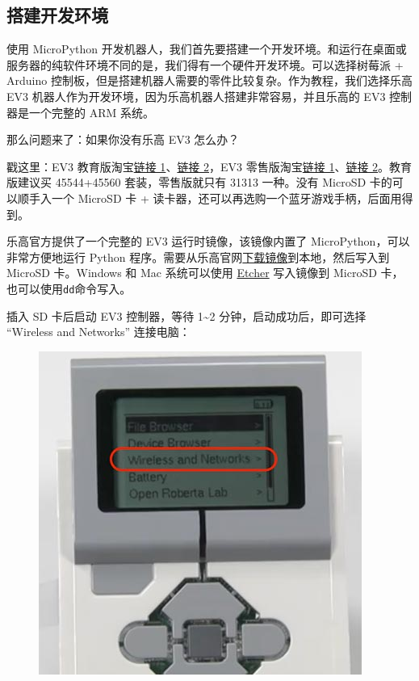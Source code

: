 \hypertarget{ux642dux5efaux5f00ux53d1ux73afux5883}{%
\subsection{搭建开发环境}\label{ux642dux5efaux5f00ux53d1ux73afux5883}}

使用 MicroPython
开发机器人，我们首先要搭建一个开发环境。和运行在桌面或服务器的纯软件环境不同的是，我们得有一个硬件开发环境。可以选择树莓派
+ Arduino
控制板，但是搭建机器人需要的零件比较复杂。作为教程，我们选择乐高 EV3
机器人作为开发环境，因为乐高机器人搭建非常容易，并且乐高的 EV3
控制器是一个完整的 ARM 系统。

那么问题来了：如果你没有乐高 EV3 怎么办？

戳这里：EV3 教育版淘宝\href{https://s.click.taobao.com/PeMmziv}{链接
1}、\href{https://s.click.taobao.com/VsKmziv}{链接 2}，EV3
零售版淘宝\href{https://s.click.taobao.com/UMLmziv}{链接
1}、\href{https://s.click.taobao.com/PuMmziv}{链接 2}。教育版建议买
45544+45560 套装，零售版就只有 31313 一种。没有 MicroSD
卡的可以顺手入一个 MicroSD 卡 +
读卡器，还可以再选购一个蓝牙游戏手柄，后面用得到。

乐高官方提供了一个完整的 EV3 运行时镜像，该镜像内置了
MicroPython，可以非常方便地运行 Python
程序。需要从乐高官网\href{https://education.lego.com/en-us/support/mindstorms-ev3/python-for-ev3}{下载镜像}到本地，然后写入到
MicroSD 卡。Windows 和 Mac 系统可以使用
\href{https://www.balena.io/etcher/}{Etcher} 写入镜像到 MicroSD
卡，也可以使用\texttt{dd}命令写入。

插入 SD 卡后启动 EV3 控制器，等待 1\textasciitilde2
分钟，启动成功后，即可选择 ``Wireless and Networks'' 连接电脑：

 
 \begin{figure}[htp]
	\centering
	\includegraphics[width=0.6\linewidth]{fig/1346188160794690l.png}
\end{figure}


